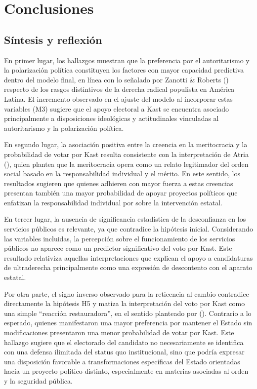 \documentclass[
  spanish,
  a4paper,
  oneside]{scrbook}
\begin{document}

\chapter{Conclusiones}\label{conclusiones}

\section{Síntesis y reflexión}\label{suxedntesis-y-reflexiuxf3n}

En primer lugar, los hallazgos muestran que la preferencia por el
autoritarismo y la polarización política constituyen los factores con
mayor capacidad predictiva dentro del modelo final, en línea con lo
señalado por Zanotti \& Roberts ()
respecto de los rasgos distintivos de la derecha radical populista en
América Latina. El incremento observado en el ajuste del modelo al
incorporar estas variables (M3) sugiere que el apoyo electoral a Kast se
encuentra asociado principalmente a disposiciones ideológicas y
actitudinales vinculadas al autoritarismo y la polarización política.

En segundo lugar, la asociación positiva entre la creencia en la
meritocracia y la probabilidad de votar por Kast resulta consistente con
la interpretación de Atria (),
quien plantea que la meritocracia opera como un relato legitimador del
orden social basado en la responsabilidad individual y el mérito. En
este sentido, los resultados sugieren que quienes adhieren con mayor
fuerza a estas creencias presentan también una mayor probabilidad de
apoyar proyectos políticos que enfatizan la responsabilidad individual
por sobre la intervención estatal.

En tercer lugar, la ausencia de significancia estadística de la
desconfianza en los servicios públicos es relevante, ya que contradice
la hipótesis inicial. Considerando las variables incluidas, la
percepción sobre el funcionamiento de los servicios públicos no aparece
como un predictor significativo del voto por Kast. Este resultado
relativiza aquellas interpretaciones que explican el apoyo a
candidaturas de ultraderecha principalmente como una expresión de
descontento con el aparato estatal.

Por otra parte, el signo inverso observado para la reticencia al cambio
contradice directamente la hipótesis H5 y matiza la interpretación del
voto por Kast como una simple ``reacción restauradora'', en el sentido
planteado por (). Contrario
a lo esperado, quienes manifestaron una mayor preferencia por mantener
el Estado sin modificaciones presentaron una menor probabilidad de votar
por Kast. Este hallazgo sugiere que el electorado del candidato no
necesariamente se identifica con una defensa ilimitada del status quo
institucional, sino que podría expresar una disposición favorable a
transformaciones específicas del Estado orientadas hacia un proyecto
político distinto, especialmente en materias asociadas al orden y la
seguridad pública.
\end{document}
